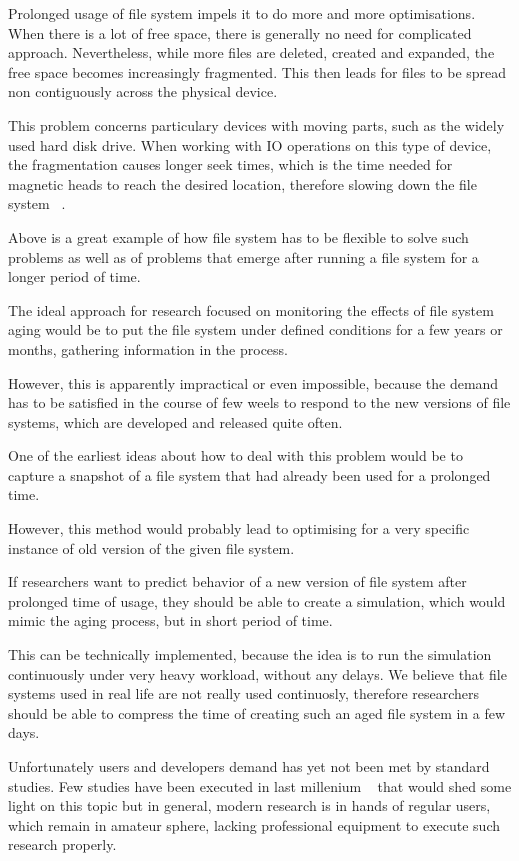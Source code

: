 \documentclass[color]{fithesis3}
\begin{document}
Prolonged usage of file system impels it to do more and more optimisations. When there is a lot of free space, there is generally no need for complicated approach. Nevertheless, while more files are deleted, created and expanded, the free space becomes increasingly fragmented. This then leads for files to be spread non contiguously across the physical device.

This problem concerns particulary devices with moving parts, such as the widely used hard disk drive. When working with IO operations on this type of device, the fragmentation causes longer seek times, which is the time needed for magnetic heads to reach the desired location, therefore slowing down the file system ~\cite{windows2006:qhe}.

Above is a great example of how file system has to be flexible to solve such problems as well as of problems that emerge after running a file system for a longer period of time.

The ideal approach for research focused on monitoring the effects of file system aging would be to put the file system under defined conditions for a few years or months, gathering information in the process. 

However, this is apparently impractical or even impossible, because the demand has to be satisfied in the course of few weels to respond to the new versions of file systems, which are developed and released quite often.

One of the earliest ideas about how to deal with this problem would be to capture a snapshot of a file system that had already been used for a prolonged time. 

However, this method would probably lead to optimising for a very specific instance of old version of the given file system. 

If researchers want to predict behavior of a new version of file system after prolonged time of usage, they should be able to create a simulation, which would mimic the aging process, but in short period of time.

This can be technically implemented, because the idea is to run the simulation continuously under very heavy workload, without any delays. We believe that file systems used in real life are not really used continuosly, therefore researchers should be able to compress the time of creating such an aged file system in a few days.

Unfortunately users and developers demand has yet not been met by standard studies. Few studies have been executed in last millenium ~\cite{harvardaging:qhe} that would shed some light on this topic but in general, modern research is in hands of regular users, which remain in amateur sphere, lacking professional equipment to execute such research properly.
\end{document}

